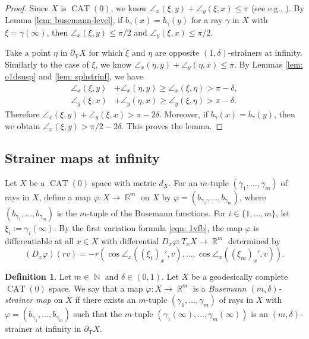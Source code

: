 \documentclass[a4paper,12pt]{amsart}
\newcommand{\CAT}{\operatorname{CAT}}
\newcommand{\R}{\operatorname{\mathbb{R}}}
\newcommand{\N}{\operatorname{\mathbb{N}}}
\numberwithin{equation}{section}
\theoremstyle{plain}
\theoremstyle{definition}
\newtheorem{defn}{Definition}[section]
\theoremstyle{remark}
\begin{document}
\begin{proof}
Since $X$ is $\CAT(0)$,
we know $\angle_x (\xi,y) + \angle_y (\xi,x) \le \pi$
(see e.g., \cite[Proposition II.9.3]{bridson-haefliger}).
By Lemma \ref{lem: busemann-level},
if $b_{\gamma}(x) = b_{\gamma}(y)$ for a ray 
$\gamma$ in $X$ with $\xi = \gamma(\infty)$,
then $\angle_x (\xi,y) \le \pi/2$ and
$\angle_y (\xi,x) \le \pi/2$.

Take a point $\eta$ in $\partial_{\mathrm{T}}X$ 
for which $\xi$ and $\eta$
are opposite $(1,\delta)$-strainers at infinity.
Similarly to the case of $\xi$,
we know $\angle_x (\eta,y) + \angle_y (\eta,x) \le \pi$.
By Lemmas \ref{lem: o1dsusp} and \ref{lem: sphstrinf},
we have
\begin{align*}
\angle_x (\xi,y) &+ \angle_x (\eta,y) \ge \angle_x (\xi,\eta) > \pi - \delta, \\
\angle_y (\xi,x) &+ \angle_y (\eta,x) \ge \angle_y (\xi,\eta) > \pi - \delta.
\end{align*}
Therefore $\angle_x (\xi,y) + \angle_y (\xi,x) > \pi - 2\delta$.
Moreover,
if $b_{\gamma}(x) = b_{\gamma}(y)$,
then we obtain $\angle_x (\xi,y) > \pi/2 - 2\delta$.
This proves the lemma.
\end{proof}

\subsection{Strainer maps at infinity}

Let $X$ be a $\CAT(0)$ space with metric $d_X$.
For an $m$-tuple $(\gamma_1, \dots, \gamma_m)$
of rays in $X$,
define a map
$\varphi \colon X \to \R^m$
on $X$
by
$\varphi = \left( b_{\gamma_1}, \dots, b_{\gamma_m} \right)$,
where 
$\left( b_{\gamma_1}, \dots, b_{\gamma_m} \right)$
is the $m$-tuple of the Busemann functions.
For $i \in \{ 1, \dots, m \}$,
let $\xi_i := \gamma_i(\infty)$.
By the first variation formula \eqref{eqn: 1vfb},
the map $\varphi$ is differentiable at all $x \in X$
with differential $D_x\varphi \colon T_xX \to \R^m$ determined by
\[
\left( D_x\varphi \right) \left( rv \right)
= -r \left( \cos \angle_x \left( \left( \xi_1 \right)_x', v \right), \dots, 
\cos \angle_x \left( \left( \xi_m \right)_x', v \right) \right).
\]

\begin{defn}\label{defn: strm}
Let $m \in \N$ and $\delta \in (0,1)$.
Let $X$ be a geodesically complete $\CAT(0)$ space.
We say that a map
$\varphi \colon X \to \R^m$ 
is a \emph{Busemann $(m,\delta)$-strainer map} on $X$
if there exists an $m$-tuple 
$\left( \gamma_1, \dots, \gamma_m \right)$
of rays in $X$ 
with $\varphi = \left( b_{\gamma_1}, \dots, b_{\gamma_m} \right)$
such that
the $m$-tuple
$\left( \gamma_1(\infty), \dots, \gamma_m(\infty) \right)$
is an $(m,\delta)$-strainer at infinity
in $\partial_{\mathrm{T}}X$.
\end{defn}
\end{document}
